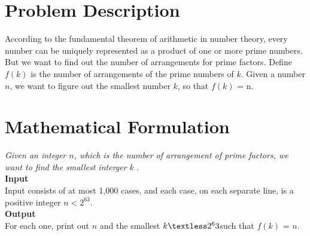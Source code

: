 \documentclass[12pt]{article}
\begin{document}

    \newcommand{\hmwkClass}{CS 255}
    \newcommand{\hmwkSemester}{Spring 2016}

    \newcommand{\hmwkAuthorName}{ Lukas, Trung, and Parker  }
    \newcommand{\hmwkAuthorID}{}

    \newcommand{\hmwkAssignmentNum}{8}

    \newcommand{\hmwkCollaborators}{   }
    \thispagestyle{fancycollab}

	\section{Problem Description}
	According to the fundamental theorem of arithmetic in number theory, every number can be uniquely represented as a product of one or more prime numbers. But we want to find out the number of arrangements for prime factors. Define $f(k)$ is the number of arrangements of the prime numbers of $k$. Given a number $n$, we want to figure out the smallest number $k$, so that $f(k)$ = n. \\

    \section{Mathematical Formulation}
 	\textit{Given an integer $n$, which is the number of arrangement of prime factors, we want to find the smallest interger $k$} . \\

	\textbf{Input} \\
     Input consists of at most 1,000 cases, and each case, on each separate line, is a positive integer $n < 2^63.$\\

   \textbf{Output} \\
 	For each one, print out $n$ and the smallest $k \textless 2^63$such that $f(k)$ = $n$. \\
\end{document}
